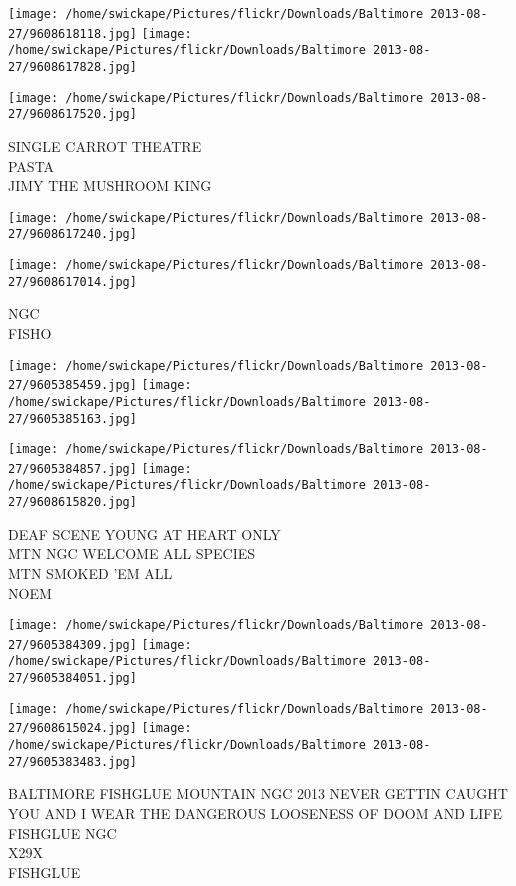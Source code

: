 \documentclass[10pt,letterpaper]{article}
\begin{document}
\texttt{[image: /home/swickape/Pictures/flickr/Downloads/Baltimore 2013-08-27/9608618118.jpg]}
\texttt{[image: /home/swickape/Pictures/flickr/Downloads/Baltimore 2013-08-27/9608617828.jpg]}

\texttt{[image: /home/swickape/Pictures/flickr/Downloads/Baltimore 2013-08-27/9608617520.jpg]}

SINGLE CARROT THEATRE\\
PASTA\\
JIMY THE MUSHROOM KING\\
\pagebreak

\texttt{[image: /home/swickape/Pictures/flickr/Downloads/Baltimore 2013-08-27/9608617240.jpg]}

\vspace{0.25in}
\texttt{[image: /home/swickape/Pictures/flickr/Downloads/Baltimore 2013-08-27/9608617014.jpg]}

NGC\\
FISHO\\
\pagebreak

\texttt{[image: /home/swickape/Pictures/flickr/Downloads/Baltimore 2013-08-27/9605385459.jpg]}
\texttt{[image: /home/swickape/Pictures/flickr/Downloads/Baltimore 2013-08-27/9605385163.jpg]}

\texttt{[image: /home/swickape/Pictures/flickr/Downloads/Baltimore 2013-08-27/9605384857.jpg]}
\texttt{[image: /home/swickape/Pictures/flickr/Downloads/Baltimore 2013-08-27/9608615820.jpg]}

DEAF SCENE YOUNG AT HEART ONLY\\
MTN NGC WELCOME ALL SPECIES\\
MTN SMOKED 'EM ALL\\
NOEM\\
\pagebreak

\texttt{[image: /home/swickape/Pictures/flickr/Downloads/Baltimore 2013-08-27/9605384309.jpg]}
\texttt{[image: /home/swickape/Pictures/flickr/Downloads/Baltimore 2013-08-27/9605384051.jpg]}

\texttt{[image: /home/swickape/Pictures/flickr/Downloads/Baltimore 2013-08-27/9608615024.jpg]}
\texttt{[image: /home/swickape/Pictures/flickr/Downloads/Baltimore 2013-08-27/9605383483.jpg]}

BALTIMORE FISHGLUE MOUNTAIN NGC 2013 NEVER GETTIN CAUGHT\\
YOU AND I WEAR THE DANGEROUS LOOSENESS OF DOOM AND LIFE FISHGLUE NGC\\
X29X\\
FISHGLUE\\
\pagebreak
\end{document}
